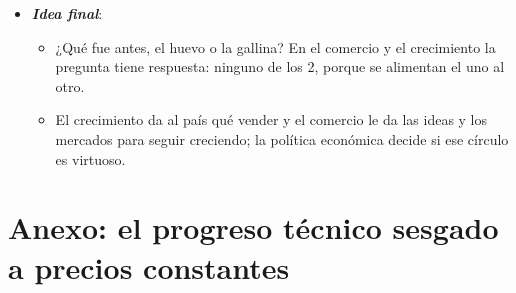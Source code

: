 \documentclass[11pt]{article}
\begin{document}
\begin{itemize}
\begin{itemize}
  \item Lo que decide es si el comercio sube la productividad, con ideas, competencia y selección de empresas, porque, como escribió  en 1990, «la productividad no lo es todo, pero a largo plazo es casi todo».\footnote{En el original: «Productivity isn't everything, but in the long run it is almost everything»\nocite{Krugman1990Age}.}
  \end{itemize}
\item \textbf{\emph{Idea final}}:
  \begin{itemize}
  \item ¿Qué fue antes, el huevo o la gallina? En el comercio y el crecimiento la pregunta tiene respuesta: ninguno de los 2, porque se alimentan el uno al otro.

  \item El crecimiento da al país qué vender y el comercio le da las ideas y los mercados para seguir creciendo; la política económica decide si ese círculo es virtuoso.
  \end{itemize}
\end{itemize}

\clearpage
\appendix

\section{Anexo: el progreso técnico sesgado a precios constantes}\label{anexo:progreso}
\end{document}
